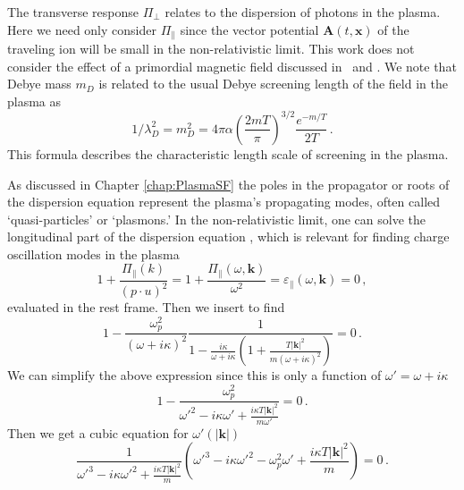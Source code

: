 The transverse response $\Pi_{\perp}$ relates to the dispersion of photons in the plasma. Here we need only consider $\Pi_\parallel$ since the vector potential $\boldsymbol{A}(t,\boldsymbol{x})$ of the traveling ion will be small in the non-relativistic limit. This work does not consider the effect of a primordial magnetic field discussed in~\cite{Steinmetz:2023nsc} and . We note that Debye mass $m_D$ is related to the usual Debye screening length of the field in the plasma as
\begin{equation}\label{eq:mL}
	1/\lambda_D^{2} = m_D^2= 4 \pi \alpha \left(\frac{2mT}{\pi}\right)^{3/2}\frac{e^{-m/T}}{2T}\,.
\end{equation}
This formula describes the characteristic length scale of screening in the plasma.

As discussed in Chapter \ref{chap:PlasmaSF} the poles in the propagator or roots of the dispersion equation represent the plasma's propagating modes, often called `quasi-particles' or `plasmons.' In the non-relativistic limit, one can solve the longitudinal part of the dispersion equation , which is relevant for finding charge oscillation modes in the plasma
\begin{equation}
    1+ \frac{\Pi_\parallel( k)}{(p\cdot u)^2}= 1+ \frac{\Pi_\parallel(\omega, \boldsymbol{k})}{\omega^2}=\varepsilon_\parallel(\omega,\boldsymbol{k}) =0 \,,
\end{equation}
evaluated in the rest frame. Then we insert  to find
\begin{equation}
   1- \frac{\omega_p^2}{(\omega+ i \kappa)^2} \frac{1}{1-\frac{i\kappa}{\omega+ i \kappa}\left(1+\frac{T |\boldsymbol{k}|^2}{m(\omega+ i \kappa)^2} \right)}=0 \,.
\end{equation}
We can simplify the above expression since this is only a function of $\omega' =\omega+i\kappa$
\begin{equation}
   1- \frac{\omega_p^2}{\omega'^2-i\kappa\omega'+\frac{i\kappa T |\boldsymbol{k}|^2}{m \omega'} }=0 \,.
\end{equation}
Then we get a cubic equation for $\omega'(|\boldsymbol{k}|)$
\begin{equation}\label{eq:dispfact}
   \frac{1}{\omega'^3-i\kappa\omega'^2+\frac{i\kappa T |\boldsymbol{k}|^2}{m} }
    \left(\omega'^3-i\kappa\omega'^2 - \omega_p^2\omega'+\frac{i\kappa T |\boldsymbol{k}|^2}{m} \right)=0 \,.
\end{equation}
